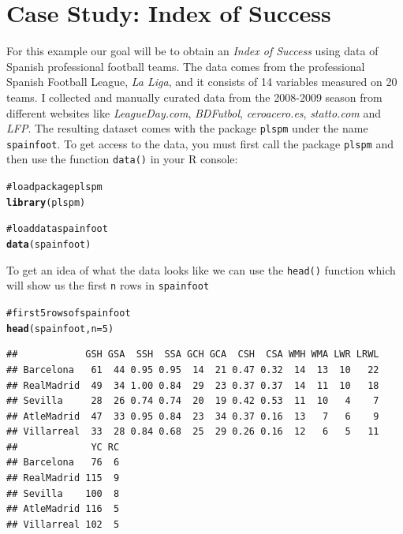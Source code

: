 \documentclass[12pt]{book}\usepackage{graphicx, color}
\makeatletter
\newcommand{\hlfunctioncall}[1]{\textcolor[rgb]{0.501960784313725,0,0.329411764705882}{\textbf{#1}}}%
\newcommand{\hlcomment}[1]{\textcolor[rgb]{0.180392156862745,0.6,0.341176470588235}{#1}}%
\newenvironment{kframe}{%
 \def\at@end@of@kframe{}%
 \ifinner\ifhmode%
  \def\at@end@of@kframe{\end{minipage}}%
  \begin{minipage}{\columnwidth}%
 \fi\fi%
 \def\FrameCommand##1{\hskip\@totalleftmargin \hskip-\fboxsep
 \colorbox{shadecolor}{##1}\hskip-\fboxsep
     \hskip-\linewidth \hskip-\@totalleftmargin \hskip\columnwidth}%
 \MakeFramed {\advance\hsize-\width
   \@totalleftmargin\z@ \linewidth\hsize
   \@setminipage}}%
 {\par\unskip\endMakeFramed%
 \at@end@of@kframe}
\newenvironment{knitrout}{}{} %
\newcommand{\plspm}{\texttt{plspm}}
\newcommand{\code}[1]{\texttt{#1}}
\makeatother
\begin{document}
\section{Case Study: Index of Success}
For this example our goal will be to obtain an \textit{Index of Success} using data of Spanish professional football teams. The data comes from the professional Spanish Football League, \textit{La Liga}, and it consists of 14 variables measured on 20 teams. I collected and manually curated data from the 2008-2009 season from different websites like \textit{LeagueDay.com}, \textit{BDFutbol}, \textit{ceroacero.es}, \textit{statto.com} and \textit{LFP}. The resulting dataset comes with the package \plspm{} under the name \texttt{spainfoot}. To get access to the data, you must first call the package \plspm{} and then use the function \code{data()} in your R console:



\begin{knitrout}
\color{fgcolor}\begin{kframe}
\begin{alltt}
\hlcomment{# load package plspm}
\hlfunctioncall{library}(plspm)

\hlcomment{# load data spainfoot}
\hlfunctioncall{data}(spainfoot)
\end{alltt}
\end{kframe}
\end{knitrout}


To get an idea of what the data looks like we can use the \texttt{head()} function which will show us the first \texttt{n} rows in \texttt{spainfoot}
\begin{knitrout}
\color{fgcolor}\begin{kframe}
\begin{alltt}
\hlcomment{# first 5 rows of spainfoot}
\hlfunctioncall{head}(spainfoot, n = 5)
\end{alltt}
\begin{verbatim}
##            GSH GSA  SSH  SSA GCH GCA  CSH  CSA WMH WMA LWR LRWL
## Barcelona   61  44 0.95 0.95  14  21 0.47 0.32  14  13  10   22
## RealMadrid  49  34 1.00 0.84  29  23 0.37 0.37  14  11  10   18
## Sevilla     28  26 0.74 0.74  20  19 0.42 0.53  11  10   4    7
## AtleMadrid  47  33 0.95 0.84  23  34 0.37 0.16  13   7   6    9
## Villarreal  33  28 0.84 0.68  25  29 0.26 0.16  12   6   5   11
##             YC RC
## Barcelona   76  6
## RealMadrid 115  9
## Sevilla    100  8
## AtleMadrid 116  5
## Villarreal 102  5
\end{verbatim}
\end{kframe}
\end{knitrout}
\end{document}
